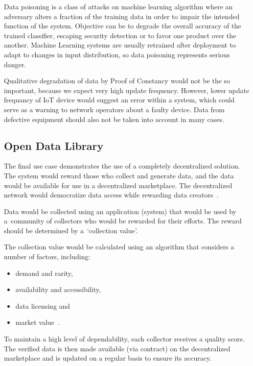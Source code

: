 Data poisoning is a class of attacks on machine learning algorithm where an adversary alters a fraction of the training data in order to impair the intended function of the system.
Objective can be to degrade the overall accuracy of the trained classifier, escaping security detection or to favor one product over the another.
Machine Learning systems are usually retrained after deployment to adapt to changes in input distribution, so data poisoning represents serious danger.

Qualitative degradation of data by Proof of Constancy would not be the so important, because we expect very high update frequency.
However, lower update frequancy of IoT device would suggest an error within a system, which could serve as a warning to network operators about a faulty device.
Data from defective equipment should also not be taken into account in many cases.

\subsection{Open Data Library}

The final use case demonstrates the use of a completely decentralized solution.
The system would reward those who collect and generate data, and the data would be available for use in a decentralized marketplace.
The decentralized network would democratize data access while rewarding data creators~\cite{dataeum}.

Data would be collected using an application (system) that would be used by a~community of collectors who would be rewarded for their efforts.
The reward should be determined by a~\enquote*{collection value}.

The collection value would be calculated using an algorithm that considers a number of factors, including:
\begin{itemize}
    \item demand and rarity,
    \item availability and accessibility,
    \item data licensing and
    \item market value~\cite{dataeum}.
\end{itemize}

To maintain a high level of dependability, each collector receives a quality score.
The verified data is then made available (via contract) on the decentralized marketplace and is updated on a regular basis to ensure its accuracy.

